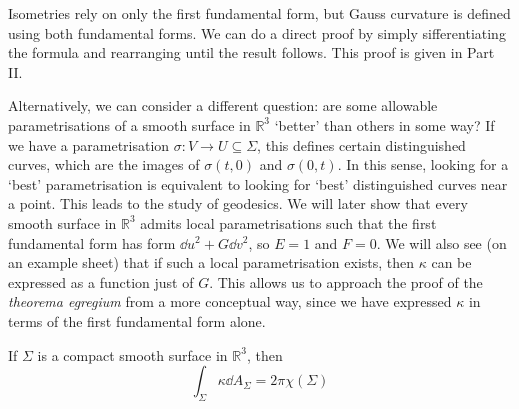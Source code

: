 \begin{remark}
	Isometries rely on only the first fundamental form, but Gauss curvature is defined using both fundamental forms.
	We can do a direct proof by simply sifferentiating the formula and rearranging until the result follows.
	This proof is given in Part II.

	Alternatively, we can consider a different question: are some allowable parametrisations of a smooth surface in \( \mathbb R^3 \) `better' than others in some way?
	If we have a parametrisation \( \sigma \colon V \to U \subseteq \Sigma \), this defines certain distinguished curves, which are the images of \( \sigma(t,0) \) and \( \sigma(0,t) \).
	In this sense, looking for a `best' parametrisation is equivalent to looking for `best' distinguished curves near a point.
	This leads to the study of geodesics.
	We will later show that every smooth surface in \( \mathbb R^3 \) admits local parametrisations such that the first fundamental form has form \( \dd{u}^2 + G \dd{v}^2 \), so \( E = 1 \) and \( F = 0 \).
	We will also see (on an example sheet) that if such a local parametrisation exists, then \( \kappa \) can be expressed as a function just of \( G \).
	This allows us to approach the proof of the \textit{theorema egregium} from a more conceptual way, since we have expressed \( \kappa \) in terms of the first fundamental form alone.
\end{remark}
\begin{theorem}
	If \( \Sigma \) is a compact smooth surface in \( \mathbb R^3 \), then
	\[
		\int_\Sigma \kappa \dd{A_\Sigma} = 2 \pi \chi(\Sigma)
	\]
\end{theorem}
